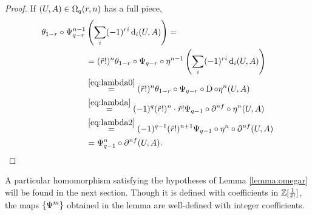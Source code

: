 \begin{proof} If $(U,A)\in \Om[q](r,n)$ has a full piece,
\begin{align*}
	\theta_{1-r}\circ \Psiom_{q-r}^{n-1}&\left(\sum_i (-1)^{ri} \d_i(U,A)\right) =
	\\
	&= (\tilde{r}!)^{n}\theta_{1-r}\circ \Psiom_{q-r}\circ \eta^{n-1}\left(\sum_i (-1)^{ri} \d_i(U,A)\right)
	\\
	&\overset{\eqref{eq:lambda0}}{=} (\tilde{r}!)^{n}\theta_{1-r}\circ \Psiom_{q-r}\circ \DDD\circ \eta^{n}(U,A)
	\\
	&\overset{\eqref{eq:lambda}}{=} (-1)^{q}(\tilde{r}!)^{n} \cdot \tilde{r}!\Psiom_{q-1}\circ \partial^{\nf}\circ \eta^{n}(U,A)
	\\
		&\overset{\eqref{eq:lambda2}}{=} (-1)^{q-1}(\tilde{r}!)^{n+1}\Psiom_{q-1}\circ \eta^n\circ \partial^{\nf}(U,A)
	\\
	&= \Psiom^{n}_{q-1}\circ \partial^{\nf}(U,A).\qedhere
\end{align*}
\end{proof}

\begin{remark}
	A particular homomorphism satisfying the hypotheses of Lemma \ref{lemma:omegar} will be found in the next section. Though it is defined with coefficients in $\bZ[\frac{1}{\tilde{r}!}]$, the maps $\{\Psiom^m\}$ obtained in the lemma are well-defined with integer coefficients.
\end{remark}